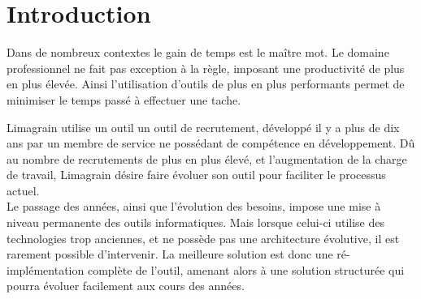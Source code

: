 \cleardoublepage

\chapter*{Introduction}





Dans de nombreux contextes le gain de temps est le maître mot. Le domaine professionnel ne fait pas exception à la règle, imposant une productivité de plus en plus élevée. Ainsi l'utilisation d'outils de plus en plus performants permet de minimiser le temps passé à effectuer une tache.


Limagrain utilise un outil un outil de recrutement, développé il y a plus de dix ans par un membre de service ne possédant de compétence en développement. Dû au nombre de recrutements de plus en plus élevé, et  l'augmentation de la charge de travail, Limagrain désire faire évoluer son outil pour faciliter le processus actuel.
\\


Le passage des années, ainsi que l'évolution des besoins, impose une mise à niveau permanente des outils informatiques. Mais lorsque celui-ci utilise des technologies trop anciennes, et ne possède pas une architecture évolutive, il est rarement possible d'intervenir. La meilleure solution est donc une ré-implémentation complète de l'outil, amenant alors à une solution structurée qui pourra évoluer facilement aux cours des années.
\\


